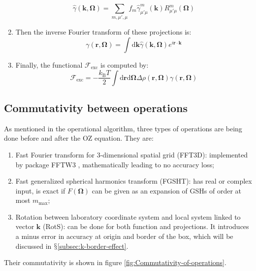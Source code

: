 \begin{enumerate}
\begin{equation}
\hat{\gamma}(\mathbf{k},\mathbf{\Omega})=\sum_{m,\mu',\mu}f_{m}\hat{\gamma}_{\mu'\mu}^{m}(\mathbf{k})R_{\mu'\mu}^{m}(\mathbf{\Omega})\label{eq:fgsht-bwd}
\end{equation}
\item Then the inverse Fourier transform of these projections is:
\begin{equation}
\gamma(\mathbf{r},\mathbf{\Omega})=\int\mathrm{d}\mathbf{k}\hat{\gamma}(\mathbf{k},\mathbf{\Omega})e^{i\mathbf{r}\cdot\mathbf{k}}
\end{equation}
\item Finally, the functional $\mathcal{F}_{\mathrm{exc}}$ is computed
by:
\begin{equation}
\mathcal{F}_{\mathrm{exc}}=-\frac{k_{\mathrm{B}}T}{2}\int\mathrm{d}\mathbf{r}\mathrm{d}\mathbf{\Omega}\Delta\rho(\mathbf{r},\mathbf{\Omega})\gamma(\mathbf{r},\mathbf{\Omega})
\end{equation}
\end{enumerate}

\subsection{Commutativity between operations\label{subsec:Commutativity-between-operations}}

As mentioned in the operational algorithm, three types of operations
are being done before and after the \acs{OZ} equation. They are:
\begin{enumerate}
\item Fast Fourier transform for 3-dimensional spatial grid (\acs{FFT}3D):
implemented by package FFTW3 \citep{FFTW3}, mathematically leading
to no accuracy loss;
\item Fast generalized spherical harmonics transform (\acs{FGSHT}): has
real or complex input, is exact if $F(\mathbf{\Omega})$ can be given
as an expansion of \acs{GSH}s of order at most $m_{\mathrm{max}}$;
\item Rotation between laboratory coordinate system and local system linked
to vector $\mathbf{k}$ (RotS): can be done for both function and
projections. It introduces a minus error in accuracy at origin and
border of the box, which will be discussed in $\mathsection$\ref{subsec:k-border-effect}.
\end{enumerate}
Their commutativity is shown in figure \ref{fig:Commutativity-of-operations}.

